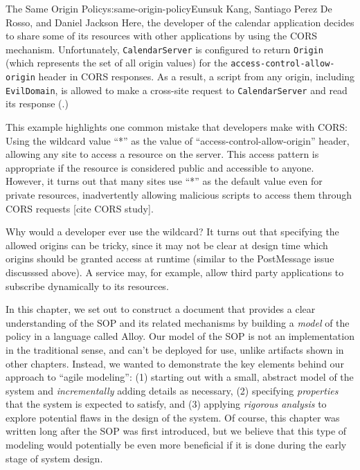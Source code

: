 \begin{aosachapter}{The Same Origin Policy}{s:same-origin-policy}{Eunsuk Kang, Santiago Perez De Rosso, and Daniel Jackson}
Here, the developer of the calendar application decides to share some of
its resources with other applications by using the CORS mechanism.
Unfortunately, \texttt{CalendarServer} is configured to return
\texttt{Origin} (which represents the set of all origin values) for the
\texttt{access-control-allow-origin} header in CORS responses. As a
result, a script from any origin, including \texttt{EvilDomain}, is
allowed to make a cross-site request to \texttt{CalendarServer} and read
its response (.)


This example highlights one common mistake that developers make with
CORS: Using the wildcard value ``*'' as the value of
``access-control-allow-origin'' header, allowing any site to access a
resource on the server. This access pattern is appropriate if the
resource is considered public and accessible to anyone. However, it
turns out that many sites use ``*'' as the default value even for
private resources, inadvertently allowing malicious scripts to access
them through CORS requests {[}cite CORS study{]}.

Why would a developer ever use the wildcard? It turns out that
specifying the allowed origins can be tricky, since it may not be clear
at design time which origins should be granted access at runtime
(similar to the PostMessage issue discusssed above). A service may, for
example, allow third party applications to subscribe dynamically to its
resources.

\label{conclusion}

In this chapter, we set out to construct a document that provides a
clear understanding of the SOP and its related mechanisms by building a
\emph{model} of the policy in a language called Alloy. Our model of the
SOP is not an implementation in the traditional sense, and can't be
deployed for use, unlike artifacts shown in other chapters. Instead, we
wanted to demonstrate the key elements behind our approach to ``agile
modeling'': (1) starting out with a small, abstract model of the system
and \emph{incrementally} adding details as necessary, (2) specifying
\emph{properties} that the system is expected to satisfy, and (3)
applying \emph{rigorous analysis} to explore potential flaws in the
design of the system. Of course, this chapter was written long after the
SOP was first introduced, but we believe that this type of modeling
would potentially be even more beneficial if it is done during the early
stage of system design.


\end{aosachapter}
